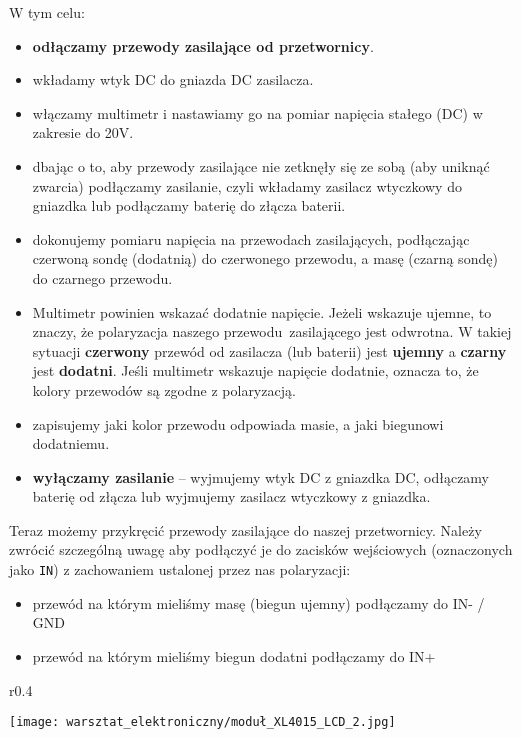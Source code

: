 \documentclass{pdfBooklets}
\begin{document}
\noindent W tym celu:
\begin{itemize}
	\item \textbf{odłączamy przewody zasilające od przetwornicy}.
	\item wkładamy wtyk DC do gniazda DC zasilacza.
	\item włączamy multimetr i nastawiamy go na pomiar napięcia stałego (DC) w zakresie do 20V.
	\item dbając o to, aby przewody zasilające nie zetknęły się ze sobą (aby uniknąć zwarcia) podłączamy zasilanie, czyli wkładamy zasilacz wtyczkowy do gniazdka lub podłączamy baterię do złącza baterii.
	\item dokonujemy pomiaru napięcia na przewodach zasilających, podłączając czerwoną sondę (dodatnią) do czerwonego przewodu, a masę (czarną sondę) do czarnego przewodu.
        \item Multimetr powinien wskazać dodatnie napięcie. Jeżeli wskazuje ujemne, to znaczy, że polaryzacja naszego przewodu~zasilającego jest odwrotna. W takiej sytuacji \textbf{czerwony} przewód od zasilacza (lub baterii) jest \textbf{ujemny} a \textbf{czarny} jest \textbf{dodatni}. Jeśli multimetr wskazuje napięcie dodatnie, oznacza to, że kolory przewodów są zgodne z polaryzacją. 
	\item zapisujemy jaki kolor przewodu odpowiada masie, a jaki biegunowi dodatniemu.
	\item \textbf{wyłączamy zasilanie} – wyjmujemy wtyk DC z gniazdka DC, odłączamy baterię od złącza lub wyjmujemy zasilacz wtyczkowy z gniazdka.
\end{itemize}
Teraz możemy przykręcić przewody zasilające do naszej przetwornicy. Należy zwrócić szczególną uwagę aby podłączyć je do zacisków wejściowych (oznaczonych jako \texttt{IN}) z zachowaniem ustalonej przez nas polaryzacji:
\begin{itemize}
	\item przewód na którym mieliśmy masę (biegun ujemny) podłączamy do IN- / GND
	\item przewód na którym mieliśmy biegun dodatni podłączamy do IN+
\end{itemize}

\begin{wrapfigure}{r}{0.4\textwidth}
  \begin{center}
    \vspace{-40pt}
    \texttt{[image: warsztat\_elektroniczny/moduł\_XL4015\_LCD\_2.jpg]}
    \vspace{-50pt}
  \end{center}
\end{wrapfigure}
\end{document}
